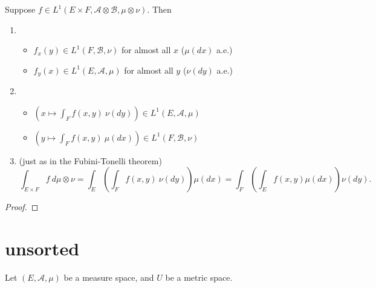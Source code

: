 \documentclass[12pt]{article}
\begin{document}
\begin{theorem}
	Suppose $f\in L^1(E\times F, \mathcal{A}\otimes\mathcal{B}, \mu\otimes\nu)$. Then 
	\begin{enumerate}
		\item 
			\begin{itemize}
				\item $f_x(y)\in L^1(F,\mathcal{B},\nu)$ for almost all $x$ ($\mu(dx)$ a.e.)
				\item $f_y(x)\in L^1(E,\mathcal{A},\mu)$ for almost all $y$ ($\nu(dy)$ a.e.)
			\end{itemize}
		\item 
			\begin{itemize}
				\item $\left( x \mapsto \int_F f(x,y)\ \nu(dy) \right)\in L^1(E,\mathcal{A},\mu)$
				\item $\left( y \mapsto \int_F f(x,y)\ \mu(dx) \right)\in L^1(F,\mathcal{B},\nu)$
			\end{itemize}
		\item (just as in the Fubini-Tonelli theorem)
			\begin{equation*}
				\int_{E\times F} f\ d\mu\otimes\nu 
				= \int_E \left( \int_F f(x,y)\ \nu(dy) \right) \mu(dx)
				= \int_F \left( \int_E f(x,y) \mu(dx) \right) \nu(dy).
			\end{equation*}
	\end{enumerate}
\end{theorem}
\begin{proof}
\end{proof}



\section{unsorted} %

Let $(E, \mathcal{A}, \mu)$ be a measure space, and $U$ be a metric space.
\end{document}
